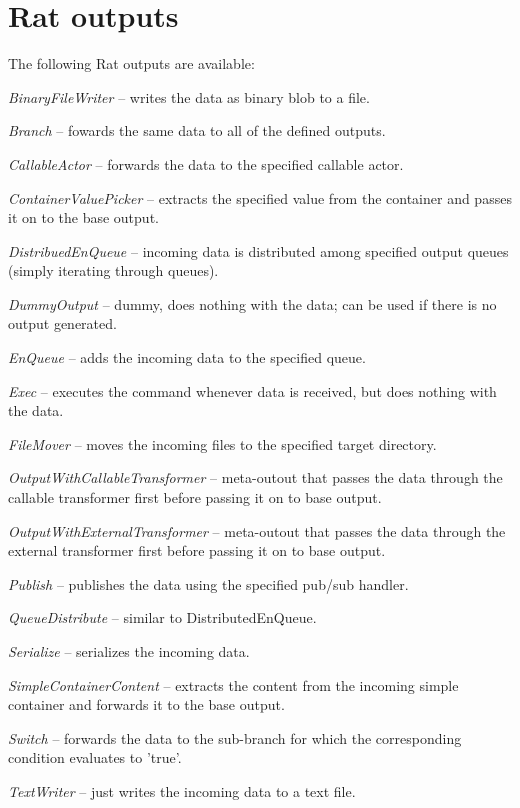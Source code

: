 \documentclass[a4paper]{book}
\begin{document}
\section{Rat outputs}
The following Rat outputs are available:
\begin{tight_itemize}
  \item \textit{BinaryFileWriter} -- writes the data as binary blob to a file.
  \item \textit{Branch} -- fowards the same data to all of the defined outputs.
  \item \textit{CallableActor} -- forwards the data to the specified callable actor.
  \item \textit{ContainerValuePicker} -- extracts the specified value from the container and passes it on to the base output.
  \item \textit{DistribuedEnQueue} -- incoming data is distributed among specified output queues (simply iterating through queues).
  \item \textit{DummyOutput} -- dummy, does nothing with the data; can be used if there is no output generated.
  \item \textit{EnQueue} -- adds the incoming data to the specified queue.
  \item \textit{Exec} -- executes the command whenever data is received, but does nothing with the data.
  \item \textit{FileMover} -- moves the incoming files to the specified target directory.
  \item \textit{OutputWithCallableTransformer} -- meta-outout that passes the data through the callable transformer first before passing it on to base output.
  \item \textit{OutputWithExternalTransformer} -- meta-outout that passes the data through the external transformer first before passing it on to base output.
  \item \textit{Publish} -- publishes the data using the specified pub/sub handler.
  \item \textit{QueueDistribute} -- similar to DistributedEnQueue.
  \item \textit{Serialize} -- serializes the incoming data.
  \item \textit{SimpleContainerContent} -- extracts the content from the incoming simple container and forwards it to the base output.
  \item \textit{Switch} -- forwards the data to the sub-branch for which the corresponding condition evaluates to 'true'.
  \item \textit{TextWriter} -- just writes the incoming data to a text file.
\end{tight_itemize}
\end{document}
